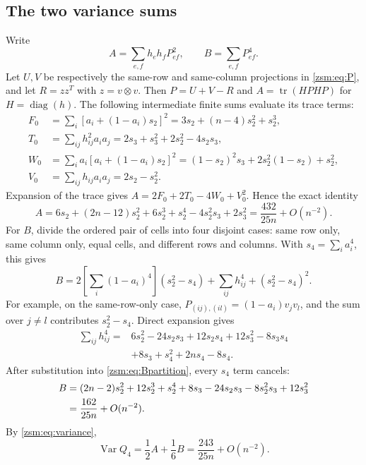 \documentclass[11pt]{article}
\theoremstyle{definition}\newtheorem{definition}[theorem]{Definition}
\theoremstyle{remark}\newtheorem{remark}[theorem]{Remark}
\newcommand{\tr}{\operatorname{tr}}
\newcommand{\Var}{\operatorname{Var}}
\begin{document}
\subsection{The two variance sums}
Write
\[
 A=\sum_{e,f}h_eh_fP_{ef}^2,\qquad B=\sum_{e,f}P_{ef}^4.
\]
Let $U,V$ be respectively the same-row and same-column projections in
\eqref{zsm:eq:P}, and let $R=zz^T$ with $z=v\otimes v$. Then $P=U+V-R$ and
$A=\tr(HPHP)$ for $H=\operatorname{diag}(h)$. The following intermediate
finite sums evaluate its trace terms:
\begin{align*}
 F_0&=\sum_i[a_i+(1-a_i)s_2]^2=3s_2+(n-4)s_2^2+s_2^3,\\
 T_0&=\sum_{ij}h_{ij}^2a_ia_j=2s_3+s_3^2+2s_2^2-4s_2s_3,\\
 W_0&=\sum_i a_i[a_i+(1-a_i)s_2]^2
       =(1-s_2)^2s_3+2s_2^2(1-s_2)+s_2^2,\\
 V_0&=\sum_{ij}h_{ij}a_ia_j=2s_2-s_2^2.
\end{align*}
Expansion of the trace gives $A=2F_0+2T_0-4W_0+V_0^2$. Hence the exact identity
\begin{equation}\label{zsm:eq:Aexact}
 A=6s_2+(2n-12)s_2^2+6s_2^3+s_2^4-4s_2^2s_3+2s_3^2
  =\frac{432}{25n}+O(n^{-2}).
\end{equation}
For $B$, divide the ordered pair of cells into four disjoint cases: same row
only, same column only, equal cells, and different rows and columns. With
$s_4=\sum_i a_i^4$, this gives
\begin{equation}\label{zsm:eq:Bpartition}
 B=2\left[\sum_i(1-a_i)^4\right](s_2^2-s_4)
     +\sum_{ij}h_{ij}^4+(s_2^2-s_4)^2.
\end{equation}
For example, on the same-row-only case,
$P_{(ij),(il)}=(1-a_i)v_jv_l$, and the sum over $j\ne l$ contributes
$s_2^2-s_4$. Direct expansion gives
\begin{align*}
 \sum_{ij}h_{ij}^4={}&6s_2^2-24s_2s_3+12s_2s_4+12s_3^2-8s_3s_4\\
 &+8s_3+s_4^2+2ns_4-8s_4.
\end{align*}
After substitution into \eqref{zsm:eq:Bpartition}, every $s_4$ term cancels:
\begin{align}
 B={}&(2n-2)s_2^2+12s_2^3+s_2^4+8s_3-24s_2s_3
             -8s_2^2s_3+12s_3^2\notag\\
   ={}&\frac{162}{25n}+O(n^{-2}).\label{zsm:eq:Bexact}
\end{align}
By \eqref{zsm:eq:variance},
\begin{equation}\label{zsm:eq:varlead}
 \Var Q_4=\frac12A+\frac16B=\frac{243}{25n}+O(n^{-2}).
\end{equation}
\end{document}
